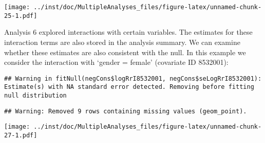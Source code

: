 \documentclass[
]{article}
\newenvironment{Shaded}{\begin{snugshade}}{\end{snugshade}}
\newcommand{\CommentTok}[1]{\textcolor[rgb]{0.56,0.35,0.01}{\textit{#1}}}
\newcommand{\DataTypeTok}[1]{\textcolor[rgb]{0.13,0.29,0.53}{#1}}
\newcommand{\DecValTok}[1]{\textcolor[rgb]{0.00,0.00,0.81}{#1}}
\newcommand{\KeywordTok}[1]{\textcolor[rgb]{0.13,0.29,0.53}{\textbf{#1}}}
\newcommand{\NormalTok}[1]{#1}
\newcommand{\OperatorTok}[1]{\textcolor[rgb]{0.81,0.36,0.00}{\textbf{#1}}}
\newcommand{\StringTok}[1]{\textcolor[rgb]{0.31,0.60,0.02}{#1}}
\begin{document}
\texttt{[image: ../inst/doc/MultipleAnalyses\_files/figure-latex/unnamed-chunk-25-1.pdf]}

Analysis 6 explored interactions with certain variables. The estimates
for these interaction terms are also stored in the analysis summary. We
can examine whether these estimates are also consistent with the null.
In this example we consider the interaction with `gender = female'
(covariate ID 8532001):

\begin{Shaded}
\end{Shaded}

\begin{verbatim}
## Warning in fitNull(negCons$logRrI8532001, negCons$seLogRrI8532001): Estimate(s) with NA standard error detected. Removing before fitting null distribution
\end{verbatim}

\begin{verbatim}
## Warning: Removed 9 rows containing missing values (geom_point).
\end{verbatim}

\texttt{[image: ../inst/doc/MultipleAnalyses\_files/figure-latex/unnamed-chunk-27-1.pdf]}
\end{document}
